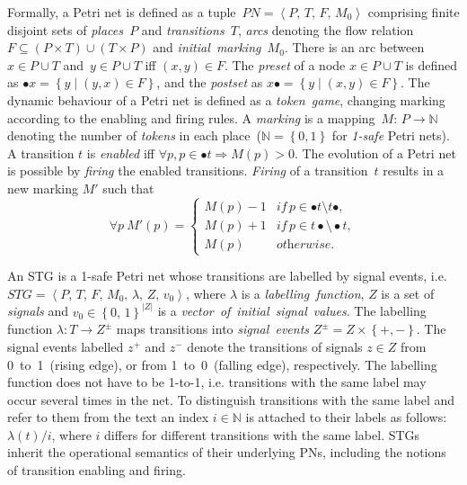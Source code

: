 \documentclass[british,compsoc]{IEEEtran}
\begin{document}
Formally, a Petri net is defined as a tuple~$PN=\left\langle P,\, T,\, F,\, M_{0}\right\rangle $
comprising finite disjoint sets of \emph{places~}$P$ and \emph{transitions~}$T$,
\emph{arcs} denoting the flow relation~$F\subseteq\left(P\times T\right)\cup\left(T\times P\right)$
and \emph{initial~marking~}$M_{0}$. There is an arc between~$x\in P\cup T$
and~$y\in P\cup T$ iff $\left(x,y\right)\in F$. The \emph{preset}
of a node $x\in P\cup T$ is defined as $\bullet x=\left\{ y\mid\left(y,x\right)\in F\right\} $,
and the \emph{postset} as $x\bullet=\left\{ y\mid\left(x,y\right)\in F\right\} $.
The dynamic behaviour of a Petri net is defined as a \emph{token~game},
changing marking according to the enabling and firing rules. A \emph{marking}
is a mapping~$M:\, P\rightarrow\mathbb{N}$ denoting the number of
\emph{tokens} in each place~($\mathbb{N}=\left\{ 0,1\right\} $ for
\emph{1-safe} Petri nets). A transition $t$ is \emph{enabled} iff
$\forall p,p\in\bullet t\Rightarrow M(p)>0$. The evolution of a Petri
net is possible by \emph{firing} the enabled transitions. \emph{Firing}
of a transition~$t$ results in a new marking $M'$ such that
\[
\forall p~M'(p)=\left\{ \begin{array}{ll}
M(p)-1 & \textit{if}\, p\in\bullet t\setminus t\bullet,\\
M(p)+1 & \textit{if}\, p\in t\bullet\setminus\bullet t,\\
M(p)\,\,\,\,\, & \textit{otherwise}.
\end{array}\right.
\]

An STG is a 1-safe Petri net whose transitions are labelled by signal
events, i.e. $STG=\left\langle P,\, T,\, F,\, M_{0},\,\lambda,\, Z,\, v_{0}\right\rangle $,
where $\lambda$ is a \emph{labelling~function}, $Z$ is a set of
\emph{signals} and $v_{0}\in\left\{ 0,\,1\right\} ^{\left|Z\right|}$
is a \emph{vector~of}~\emph{initial~signal~values}. The labelling
function $\lambda:T\rightarrow Z^{\pm}$ maps transitions into \emph{signal~events}
$Z^{\pm}=Z\times\left\{+,-\right\}$. The signal events labelled $z^{+}$
and $z^{-}$ denote the transitions of signals $z\in Z$ from 0~to~1~(rising
edge), or from 1~to~0~(falling edge), respectively. The labelling
function does not have to be 1-to-1, i.e. transitions with the same
label may occur several times in the net. To distinguish transitions
with the same label and refer to them from the text an index $i\in\mathbb{N}$
is attached to their labels as follows: $\lambda\left(t\right)/i$,
where $i$ differs for different transitions with the same label.
STGs inherit the operational semantics of their underlying PNs, including
the notions of transition enabling and firing.
\end{document}
